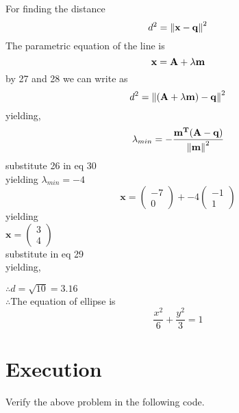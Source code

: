 \documentclass[10pt, a4paper]{article}
\newcommand{\myvec}[1]{\ensuremath{\begin{pmatrix}#1\end{pmatrix}}}
\let\vec\mathbf
\begin{document}
For finding the distance
\begin{equation}
d^2=\norm{\vec{x}-\vec{q}}^2
\end{equation}
The parametric equation of the line is
\begin{equation}
\vec{x}=\vec{A}+\lambda\vec{m}\\
\end{equation}
by 27 and 28 we can write as
\begin{equation}
d^2=\norm{(\vec{A}+\lambda\vec{m})-\vec{q}}^2
\end{equation}
yielding,\\
\begin{equation}
\lambda_{min}=-\frac{\vec{m^T}(\vec{A-q})}{\norm{\vec{m}}^2}
\end{equation}
substitute 26 in eq 30\\
yielding
$\lambda_{min}=-4$
\begin{equation}
\vec{x}=\myvec{-7\\0}+-4\myvec{-1\\1}
\end{equation}
yielding\\
$\vec{x}=\myvec{3\\4}$\\
substitute in eq 29 \\
yielding,
   
$\therefore{d}=\sqrt{10}=3.16$\\

$\therefore$The equation of ellipse is\\
\begin{equation}
\frac{x^2}{6}+\frac{y^2}{3}=1
\end{equation}
\section{Execution}
Verify the above problem in the following code.\\

\end{document}
